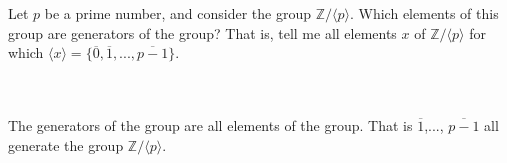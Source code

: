 Let $p$ be a prime number, and consider the group $\mathbb{Z}/\langle p\rangle$. Which elements of this
group are generators of the group? That is, tell me all elements $x$ of $\mathbb{Z}/\langle p\rangle$
for which $\langle x\rangle=\{\overline{0}, \overline{1},..., \overline{p-1}\}$.\\\\

\begin{solution}\renewcommand{\qedsymbol}{}\ \\
    The generators of the group are all elements of the group. That is
    $\overline{1}$,..., $\overline{p-1}$ all generate the group $\mathbb{Z}/\langle p\rangle$.

\end{solution}